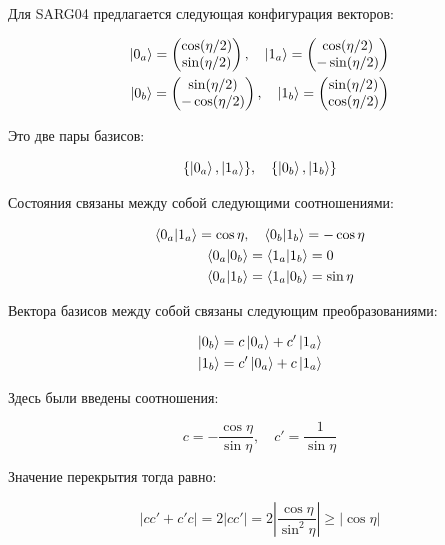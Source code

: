 \documentclass[a4paper, 12pt]{article}
\begin{document}
Для SARG04 предлагается следующая конфигурация векторов:

\begin{align}
	\ket{0_a} = 
	\begin{pmatrix}
		\cos (\eta/2)\\
		\sin(\eta/2)
	\end{pmatrix}, \quad
	\ket{1_a} = 
	\begin{pmatrix}
		\cos (\eta/2)\\
		-\sin(\eta/2)
	\end{pmatrix} \\
	\ket{0_b} = 
	\begin{pmatrix}
		\sin(\eta/2)\\
		-\cos (\eta/2)
	\end{pmatrix}, \quad
	\ket{1_b} = 
	\begin{pmatrix}
		\sin(\eta/2)\\
		\cos (\eta/2)
	\end{pmatrix}
\end{align}

Это две пары базисов:

\begin{equation}
	\{\ket{0_a}, \ket{1_a}\}, \quad \{\ket{0_b}, \ket{1_b}\}
\end{equation}

Состояния связаны между собой следующими соотношениями:

\begin{align}
	\braket{0_a|1_a} = \cos\eta, &\quad \braket{0_b|1_b} = -\cos\eta\\
	\braket{0_a|0_b} &= \braket{1_a|1_b} = 0\\
	\braket{0_a|1_b} &= \braket{1_a|0_b} = \sin \eta
\end{align}

Вектора базисов между собой связаны следующим преобразованиями:

\begin{align}
	\ket{0_b} = c \ket{0_a} + c'\ket{1_a}\\
	\ket{1_b} = c'\ket{0_a} + c\ket{1_a}
\end{align}

Здесь были введены соотношения:

\begin{equation}
	c = - \frac{\cos \eta}{\sin \eta}, \quad c' = \frac{1}{\sin\eta}
\end{equation}

Значение перекрытия тогда равно:

\begin{equation}
	|c c' + c' c| = 2 |c c'| = 2 \left|\frac{\cos\eta}{\sin^2\eta}\right| \ge |\cos \eta|
\end{equation}
\end{document}
